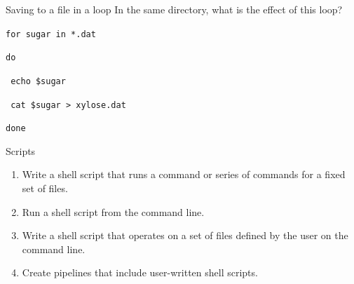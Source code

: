 \documentclass{beamer}
\begin{document}

\begin{frame}{Saving to a file in a loop }
In the same directory, what is the effect of this loop?

\begin{beamerboxesrounded}[upper=uppercolgreen,lower=lowercolgreen,shadow=false]{}
\texttt{for sugar in *.dat}

\texttt{do}

\texttt{	echo \$sugar}

\texttt{	cat \$sugar > xylose.dat}

\texttt{done}
\end{beamerboxesrounded}

\small{
}


\end{frame}

\begin{frame}{Scripts}
\begin{enumerate}
   \item{ Write a shell script that runs a command or series of commands for a fixed set of files.}
   \item{  Run a shell script from the command line.}
   \item{ Write a shell script that operates on a set of files defined by the user on the command line.}
   \item{  Create pipelines that include user-written shell scripts.}
\end{enumerate}
\end{frame}
\end{document}
